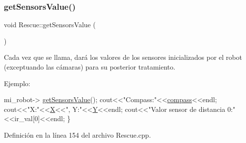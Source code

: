 \subsubsection{\texorpdfstring{get\+Sensors\+Value()}{getSensorsValue()}}
{\footnotesize\ttfamily void Rescue\+::get\+Sensors\+Value (\begin{DoxyParamCaption}{ }\end{DoxyParamCaption})}



Cada vez que se llama, dará los valores de los sensores inicializados por el robot (exceptuando las cámaras) para su posterior tratamiento. 

Ejemplo\+: 
\begin{DoxyCode}
   mi\_robot-> \hyperlink{classRescue_a68675aa6bb37102baf46803451e16c82_a68675aa6bb37102baf46803451e16c82}{getSensorsValue}();
   cout<<\textcolor{stringliteral}{"Compass:"}<<\hyperlink{classRescue_a5783a7f93b5dc970e997a919af57e0bc_a5783a7f93b5dc970e997a919af57e0bc}{compass}<<endl;
   cout<<\textcolor{stringliteral}{"X:"}<<\hyperlink{classRescue_ab2a4cd163b6619df49346383bb08d365_ab2a4cd163b6619df49346383bb08d365}{X}<<\textcolor{stringliteral}{", Y:"}<<\hyperlink{classRescue_aefe62362f68d14dc3f9234791de23882_aefe62362f68d14dc3f9234791de23882}{Y}<<endl;
   cout<<\textcolor{stringliteral}{"Valor sensor de distancia 0:"}<<ir\_val[0]<<endl;
\}
\end{DoxyCode}
 

Definición en la línea 154 del archivo Rescue.\+cpp.


